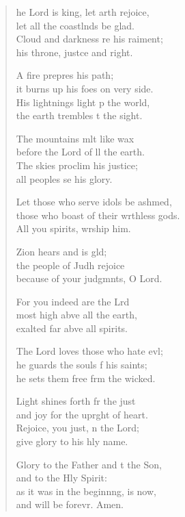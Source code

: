 \settowidth{\versewidth}{those who boast of their worthless gods. *}
\begin{verse}%
  \begin{patverse}
    he Lord is king, let arth rejoice,\Med\\
let all the coastlnds be glad.\\
Cloud and darkness re his raiment;\Med\\
his throne, just\pointup{\i}ce and right.

A fire prepres his path;\Med\\
it burns up his foes on very side.\\
His lightnings light p the world,\Med\\
the earth trembles t the sight.

The mountains mlt like wax\Med\\
before the Lord of ll the earth.\\
The skies proclim his justice;\Med\\
all peoples se his glory.

Let those who serve idols be ashmed,\Flex\\
those who boast of their wrthless gods.\Med\\
All you spirits, wrship him.

Zion hears and is gld;\Flex\\
the people of Judh rejoice\Med\\
because of your judgmnts, O Lord.

For you indeed are the Lrd\Flex\\
most high abve all the earth,\Med\\
exalted far abve all spirits.

The Lord loves those who hate ev\pointup{\i}l;\Flex\\
he guards the souls f his saints;\Med\\
he sets them free frm the wicked.

Light shines forth fr the just\Med\\
and joy for the upr\pointup{\i}ght of heart.\\
Rejoice, you just, \pointup{\i}n the Lord;\Med\\
give glory to his hly name.

Glory to the Father and t the Son,\Med\\
and to the Hly Spirit:\\
as it was in the beginn\pointup{\i}ng, is now,\Med\\
and will be forevr. Amen.
  \end{patverse}
\end{verse}
